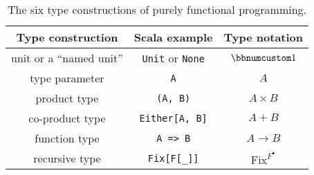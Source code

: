 \begin{wraptable}{l}{0.58\columnwidth}%
\begin{centering}
\vspace{-0.2\baselineskip}
\begin{tabular}{|c|c|c|}
\hline 
\textbf{\small{}Type construction} & \textbf{\small{}Scala example} & \textbf{\small{}Type notation}\tabularnewline
\hline 
\hline 
{\small{}unit or a ``named unit''} & {\small{}}\lstinline!Unit!{\small{} or }\lstinline!None!{\small{} } & {\small{}$\bbnum 1$}\tabularnewline
\hline 
{\small{}type parameter} & {\small{}}\lstinline!A! & {\small{}$A$}\tabularnewline
\hline 
{\small{}product type} & {\small{}}\lstinline!(A, B)! & {\small{}$A\times B$}\tabularnewline
\hline 
{\small{}co-product type} & {\small{}}\lstinline!Either[A, B]! & {\small{}$A+B$}\tabularnewline
\hline 
{\small{}function type} & {\small{}}\lstinline!A => B! & {\small{}$A\rightarrow B$}\tabularnewline
\hline 
{\small{}recursive type} & {\small{}}\lstinline!Fix[F[_]]! & {\small{}$\text{Fix}^{F^{\bullet}}$}\tabularnewline
\hline 
\end{tabular}
\par\end{centering}
\caption{The six type constructions
of purely functional programming.\label{tab:six-pure-type-constructions}}
\vspace{-0.2\baselineskip}
\end{wraptable}%

